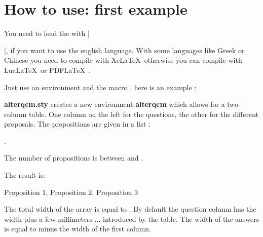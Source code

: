 \section{How to use: first example}

You need to load the  with  |\usepackage[english]{alterqcm}|, if you want to use the english language. With some languages like Greek or Chinese you need to compile with Xe\LaTeX\ otherwise you can compile with Lua\LaTeX\ or PDF\LaTeX\ .

Just use an environment  and the macro , here is an example :


 \noindent
\begin{minipage}[c][][t]{.40\linewidth}
\end{minipage}\hfill \noindent
\begin{minipage}[c][][b]{.50\linewidth}
\textbf{alterqcm.sty} creates a new environment \textbf{alterqcm} which allows for a two-column table. One column on the left for the questions, the other for the different proposals.  The propositions are given in a list :

.

 The number of propositions is between  and .
\end{minipage}

\medskip
The result is:

\bigskip
  \begin{alterqcm}
  {%
  {Proposition 1},
  {Proposition 2},
  {Proposition 3}%
  }
  \end{alterqcm}

\medskip
 The total width of the array is equal to . By default the question column has the width \tkzname{100mm} plus a few millimeters ... introduced by the table. The width of the answers is equal to  minus the width of the first column. 

